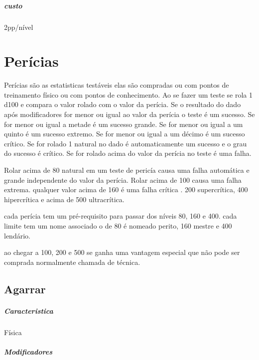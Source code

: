 \paragraph{custo} 2pp/nível
%
%
%
%
\chapter{Perícias}
Perícias são as estatisticas testáveis elas são compradas ou com pontos de treinamento físico ou com pontos de conhecimento.
Ao se fazer um teste se rola 1 d100 e compara o valor rolado com o valor da perícia.
Se o resultado do dado após modificadores for menor ou igual ao valor da perícia o teste é um sucesso.
Se for menor ou igual a metade é um sucesso grande.
Se for menor ou igual a um quinto é um sucesso extremo.
Se for menor ou igual a um décimo é um sucesso crítico.
Se for rolado 1 natural no dado é automaticamente um sucesso e o grau do sucesso é crítico.
Se for rolado acima do valor da perícia no teste é uma falha.

Rolar acima de 80 natural em um teste de pericía causa uma falha automática e grande independente do valor da perícia.
Rolar acima de 100 causa uma falha extrema. qualquer valor acima de 160 é uma falha crítica .
200 supercrítica, 400 hipercrítica e acima de 500 ultracrítica.

cada perícia tem um pré-requisito para passar dos níveis 80, 160 e 400.
cada limite tem um nome associado o de 80 é nomeado perito, 160 mestre e 400 lendário.

ao chegar a 100, 200 e 500 se ganha uma vantagem especial que não pode ser comprada normalmente chamada de técnica.
\section{Agarrar}
\paragraph{Caracteristica} Física
\paragraph{Modificadores} %
